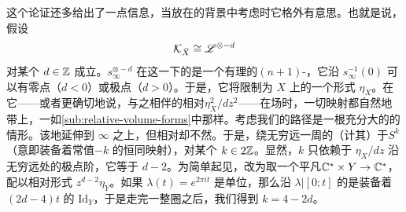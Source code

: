 这个论证还多给出了一点信息，当放在\trGrading{}的背景中考虑时它格外有意思。也就是说，假设
\begin{equation}\label{eq:canonical-bundle-pencil}
\mathcal{K}_{\bar{X}}\cong\mathscr{L}^{\otimes-d}
\end{equation}
对某个 $d\in\mathbb{Z}$ 成立。$s_\infty^{\otimes-d}$ 在这一\trIsomorphism{}下的\trPreimage{}是一个有理的\trHolomorphic{}$(n+1)$-\trForm，它沿 $s_\infty^{-1}(0)$ 可以有零点（$d<0$）或极点（$d>0$）。于是，它将限制为 $X$ 上的一个\trHolomorphic{}\trVolume{}形式 $\eta_X$。在它——或者更确切地说，与之相伴的相对\trQuadraticForm{}$\eta_X^2/dz^2$——在场时，一切\trParallelTransport{}映射都自然地带上\trGrading，一如\cref{sub:relative-volume-forms}中那样。考虑我们的路径是一根充分大的\trCircle{}的情形。该\trFibration{}\trSmooth{}地延伸到 $\infty$ 之上，但相对\trQuadraticForm{}却不然。于是，绕无穷远一周的\trMonodromy{}（计其\trGrading）\trIsotopy{}于\trSuspension{}$S^k$（意即装备着常值\trGrading{}$-k$ 的恒同映射），对某个 $k\in 2\mathbb{Z}$。显然，$k$ 只依赖于 $\eta_X/dz$ 沿无穷远处\trFiber{}的极点阶，它等于 $d-2$。为简单起见，改为取一个平凡\trFibration{}$\mathbb{C}^*\times Y\to\mathbb{C}^*$，配以相对\trVolume{}形式 $z^{d-2}\eta_Y$。如果 $\lambda(t)=e^{2\pi it}$ 是单位\trCircle，那么沿 $\lambda|[0;t]$ 的\trParallelTransport{}是装备着\trGrading{}$(2d-4)t$ 的 $\mathrm{Id}_Y$，于是走完\trCircle{}一整圈之后，我们得到 $k=4-2d$。

